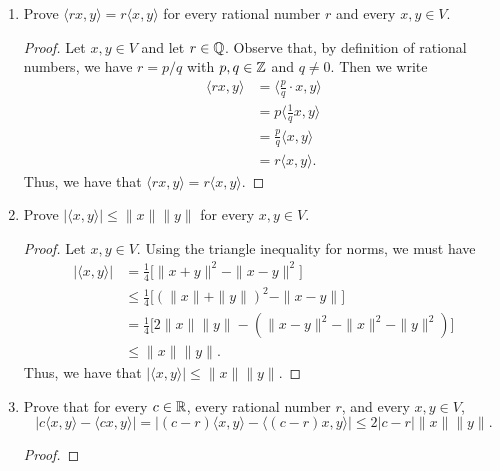 \documentclass[a4paper]{article}
\begin{document}
\begin{enumerate}
    \item[(e)] Prove \( \langle rx , y \rangle = r \langle x , y \rangle \) for every rational number \( r  \) and every \( x,y \in V  \).
        \begin{proof}
        Let \( x,y \in V  \) and let \( r \in \mathbb{Q}  \). Observe that, by definition of rational numbers, we have \( r =  p/q  \) with \( p,q \in \mathbb{Z}  \) and \( q \neq 0  \). Then we write
        \begin{align*}
            \langle rx , y \rangle &= \Big\langle \frac{ p }{ q } \cdot  x   , y \Big\rangle \\
                                   &= p \Big\langle \frac{ 1 }{ q }  x   , y  \Big\rangle \tag{Part (c)} \\
                                   &= \frac{ p }{ q }  \langle x , y \rangle \tag{Part (d)} \\
                                   &= r \langle x , y \rangle.
        \end{align*}
        Thus, we have that \( \langle rx , y \rangle = r \langle x , y \rangle \).
        \end{proof}
    \item[(f)] Prove \( |  \langle x , y \rangle |  \leq \|x\|\|y\| \) for every \( x,y \in V  \).  
        \begin{proof}
        Let \( x,y \in V  \). Using the triangle inequality for norms, we must have
        \begin{align*}
            | \langle x , y \rangle | &= \frac{ 1 }{ 4 }  \Big[ \|x + y\|^{2} - \|x - y\|^{2} \Big] \\
                                      &\leq \frac{ 1 }{ 4 }  \Big[ (\|x\| + \|y\|)^{2} - \|x - y\|\Big] \\
                                      &= \frac{ 1 }{ 4 }  \Big[ 2 \|x \| \|y\| - (\|x -y\|^{2} - \|x\|^{2} - \|y\|^{2})\Big] \\
                                      &\leq \|x\| \|y\|.  
        \end{align*}
        Thus, we have that \( | \langle x , y \rangle  |  \leq \|x \| \|y\|  \).
        \end{proof}
    \item[(g)] Prove that for every \( c \in \mathbb{R}  \), every rational number \( r  \), and every \( x,y \in V  \),
        \[ | c \langle x , y \rangle - \langle cx , y \rangle | = | (c-r)\langle x , y \rangle - \langle (c-r)x ,y  \rangle | \leq 2 | c - r  |  \|x\| \|y\|.   \]
        \begin{proof}

\end{proof}
\end{enumerate}
\end{document}

